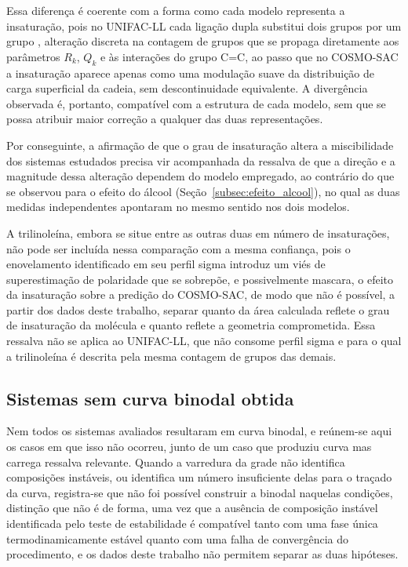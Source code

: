 Essa diferença é coerente com a forma como cada modelo representa a insaturação, pois no UNIFAC-LL cada ligação dupla substitui dois grupos  por um grupo , alteração discreta na contagem de grupos que se propaga diretamente aos parâmetros $R_k$, $Q_k$ e às interações do grupo C=C, ao passo que no COSMO-SAC a insaturação aparece apenas como uma modulação suave da distribuição de carga superficial da cadeia, sem descontinuidade equivalente. A divergência observada é, portanto, compatível com a estrutura de cada modelo, sem que se possa atribuir maior correção a qualquer das duas representações.

Por conseguinte, a afirmação de que o grau de insaturação altera a miscibilidade dos sistemas estudados precisa vir acompanhada da ressalva de que a direção e a magnitude dessa alteração dependem do modelo empregado, ao contrário do que se observou para o efeito do álcool (Seção~\ref{subsec:efeito_alcool}), no qual as duas medidas independentes apontaram no mesmo sentido nos dois modelos.

A trilinoleína, embora se situe entre as outras duas em número de insaturações, não pode ser incluída nessa comparação com a mesma confiança, pois o enovelamento identificado em seu perfil sigma introduz um viés de superestimação de polaridade que se sobrepõe, e possivelmente mascara, o efeito da insaturação sobre a predição do COSMO-SAC, de modo que não é possível, a partir dos dados deste trabalho, separar quanto da área calculada reflete o grau de insaturação da molécula e quanto reflete a geometria comprometida. Essa ressalva não se aplica ao UNIFAC-LL, que não consome perfil sigma e para o qual a trilinoleína é descrita pela mesma contagem de grupos das demais.

\subsection{Sistemas sem curva binodal obtida}
\label{subsec:casos_sem_separacao}

Nem todos os sistemas avaliados resultaram em curva binodal, e reúnem-se aqui os casos em que isso não ocorreu, junto de um caso que produziu curva mas carrega ressalva relevante. Quando a varredura da grade não identifica composições instáveis, ou identifica um número insuficiente delas para o traçado da curva, registra-se que não foi possível construir a binodal naquelas condições, distinção que não é de forma, uma vez que a ausência de composição instável identificada pelo teste de estabilidade é compatível tanto com uma fase única termodinamicamente estável quanto com uma falha de convergência do procedimento, e os dados deste trabalho não permitem separar as duas hipóteses.

